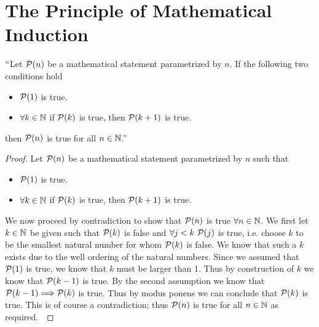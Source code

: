     \section[Mathematical Induction]{The Principle of Mathematical Induction}
        \begin{theorem}
            $``$Let $\mathcal{P}(n)$ be a mathematical statement parametrized by $n$.
            If the following two conditions hold
            \begin{itemize}
                \item
                    $\mathcal{P}(1)$ is true.
                \item
                    $\forall k \in \mathbb{N}$ if $\mathcal{P}(k)$ is true, then $\mathcal{P}(k + 1)$ is true.
            \end{itemize}
            then $\mathcal{P}(n)$ is true for all $n \in \mathbb{N}$.''
        \end{theorem}
        \begin{proof}
            Let $\mathcal{P}(n)$ be a mathematical statement parametrized by $n$ such that
            \begin{itemize}
                \item
                    $\mathcal{P}(1)$ is true.
                \item
                    $\forall k \in \mathbb{N}$ if $\mathcal{P}(k)$ is true, then $\mathcal{P}(k + 1)$ is true.
            \end{itemize}
            We now proceed by contradiction to show that   
            $\mathcal{P}(n)$ is true $\forall n \in \mathbb{N}$. We first let $k \in \mathbb{N}$ be
            given such that $\mathcal{P}(k)$ is false and $\forall j < k \
            \mathcal{P}(j)$ is true, i.e. choose $k$ to be the smallest natural number for whom
            $\mathcal{P}(k)$ is false. We know that such a $k$ exists due to the well ordering
            of the natural numbers. Since we assumed that $\mathcal{P}(1)$ is true, we know that
            $k$ must be larger than 1. Thus by construction of $k$ we know that $\mathcal{P}(k - 1)$
            is true. By the second assumption we know that $\mathcal{P}(k - 1) \Longrightarrow \mathcal{P}(k)$
            is true. Thus by modus ponens we can conclude that $\mathcal{P}(k)$ is true. 
            This is of course a contradiction; thus $\mathcal{P}(n)$ is true for all $n \in \mathbb{N}$
            as required.~\QED
        \end{proof}
